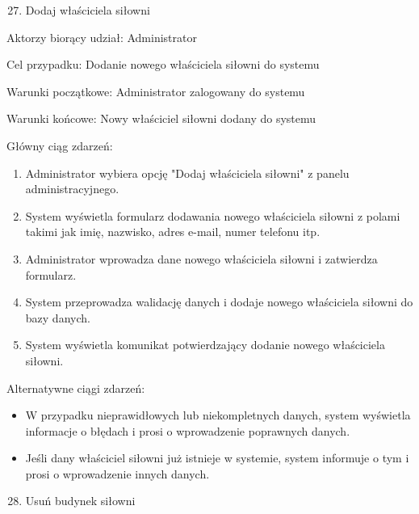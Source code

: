 \documentclass[
]{article}
\providecommand{\tightlist}{%
  \setlength{\itemsep}{0pt}\setlength{\parskip}{0pt}}
\begin{document}
{}

{}

\begin{enumerate}
\setcounter{enumi}{26}
\tightlist
\item
  {Dodaj właściciela siłowni}
\end{enumerate}

{Aktorzy biorący udział: Administrator}

{Cel przypadku: Dodanie nowego właściciela siłowni do systemu}

{Warunki początkowe: Administrator zalogowany do systemu}

{Warunki końcowe: Nowy właściciel siłowni dodany do systemu}

{Główny ciąg zdarzeń:}

\begin{enumerate}
\tightlist
\item
  {Administrator wybiera opcję "Dodaj właściciela siłowni" z panelu
  administracyjnego.}
\item
  {System wyświetla formularz dodawania nowego właściciela siłowni z
  polami takimi jak imię, nazwisko, adres e-mail, numer telefonu itp.}
\item
  {Administrator wprowadza dane nowego właściciela siłowni i zatwierdza
  formularz.}
\item
  {System przeprowadza walidację danych i dodaje nowego właściciela
  siłowni do bazy danych.}
\item
  {System wyświetla komunikat potwierdzający dodanie nowego właściciela
  siłowni.}
\end{enumerate}

{Alternatywne ciągi zdarzeń:}

\begin{itemize}
\tightlist
\item
  {W przypadku nieprawidłowych lub niekompletnych danych, system
  wyświetla informacje o błędach i prosi o wprowadzenie poprawnych
  danych.}
\item
  {Jeśli dany właściciel siłowni już istnieje w systemie, system
  informuje o tym i prosi o wprowadzenie innych danych.}
\end{itemize}

{}

{}

\begin{enumerate}
\setcounter{enumi}{27}
\tightlist
\item
  {Usuń budynek siłowni}
\end{enumerate}
\end{document}
